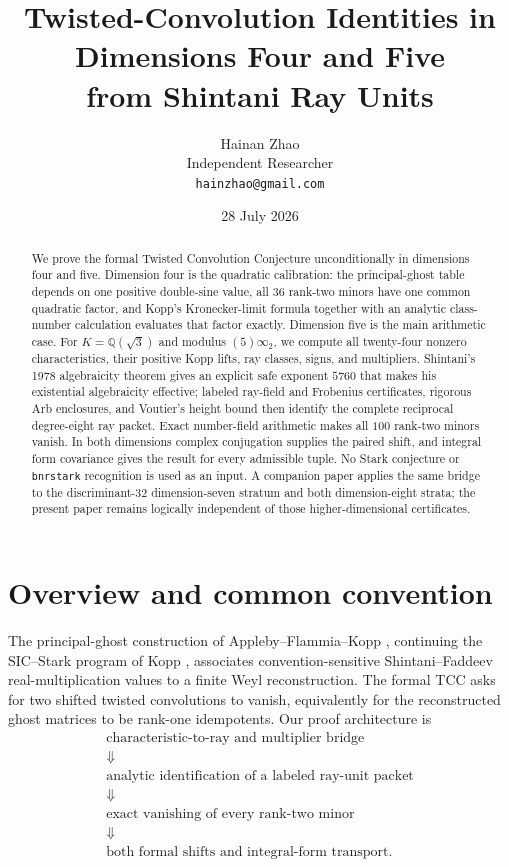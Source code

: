 \documentclass[11pt]{article}
\title{Twisted-Convolution Identities in Dimensions Four and Five\\
from Shintani Ray Units}
\author{Hainan Zhao\\
\small Independent Researcher\\
\small\texttt{hainzhao@gmail.com}}
\date{28 July 2026}
\newcommand{\Q}{\mathbb Q}
\begin{document}
\maketitle

\begin{abstract}
We prove the formal Twisted Convolution Conjecture unconditionally in
dimensions four and five.  Dimension four is the quadratic calibration:
the principal-ghost table depends on one positive double-sine value,
all $36$ rank-two minors have one common quadratic factor, and Kopp's
Kronecker-limit formula together with an analytic class-number
calculation evaluates that factor exactly.  Dimension five is the main
arithmetic case.  For $K=\Q(\sqrt3)$ and modulus $(5)\infty_2$, we
compute all twenty-four nonzero characteristics, their positive Kopp
lifts, ray classes, signs, and multipliers.  Shintani's 1978
algebraicity theorem gives an explicit safe exponent $5760$ that makes
his existential algebraicity effective; labeled ray-field
and Frobenius certificates, rigorous Arb enclosures, and Voutier's
height bound then identify the complete reciprocal degree-eight ray
packet.  Exact number-field arithmetic makes all $100$ rank-two
minors vanish.  In both dimensions complex conjugation supplies the
paired shift, and integral form covariance gives the result for every
admissible tuple.  No Stark conjecture or \texttt{bnrstark}
recognition is used as an input. A companion paper applies the same
bridge to the discriminant-$32$ dimension-seven stratum and both
dimension-eight strata; the present paper remains logically independent
of those higher-dimensional certificates.
\end{abstract}

\section{Overview and common convention}

The principal-ghost construction of Appleby--Flammia--Kopp
\cite{AFK}, continuing the SIC--Stark program of Kopp
\cite{Kopp2018}, associates convention-sensitive Shintani--Faddeev
real-multiplication values to a finite Weyl reconstruction.  The formal
TCC asks for two shifted twisted convolutions to vanish, equivalently
for the reconstructed ghost matrices to be rank-one idempotents.  Our
proof architecture is
\[
\begin{array}{c}
\text{characteristic-to-ray and multiplier bridge}\\
\Downarrow\\
\text{analytic identification of a labeled ray-unit packet}\\
\Downarrow\\
\text{exact vanishing of every rank-two minor}\\
\Downarrow\\
\text{both formal shifts and integral-form transport}.
\end{array}
\]
\end{document}
